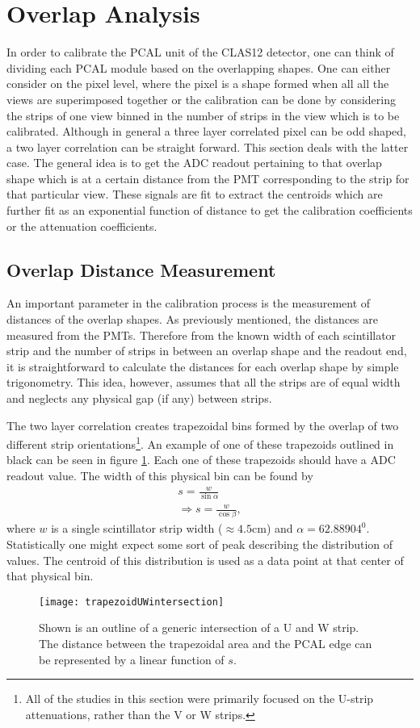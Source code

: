 \section{Overlap Analysis}
In order to calibrate the PCAL unit of the CLAS12 detector, one can think of dividing each PCAL module based on the 
overlapping shapes. One can either consider on the pixel level, where the pixel is a shape formed when all 
all the views are superimposed together or the calibration can be done by considering the strips of one 
view binned in the number of strips in the view which is to be calibrated. Although in general a three layer 
correlated pixel can be odd shaped, a two layer correlation can be straight forward. This section deals with the 
latter case. The general idea is to get the ADC readout pertaining to that overlap shape which is at a certain 
distance from the PMT corresponding to the strip for that particular view. These signals are fit to extract the 
centroids which are further fit as an exponential function of distance to get the calibration coefficients 
or the attenuation coefficients. 


\FloatBarrier
\subsection{Overlap Distance Measurement}
An important parameter in the calibration process is the measurement of distances of the overlap shapes. 
As previously mentioned, the distances are measured from the PMTs. Therefore from the known width of each 
scintillator strip and the number of strips in between an overlap shape and the readout end, it is 
straightforward to calculate the distances for each overlap shape by simple trigonometry. This idea, 
however, assumes that all the strips are of equal width and neglects any physical gap (if any) between strips.

The two layer correlation creates trapezoidal bins formed by the overlap of two different 
strip orientations\footnote{All of the studies in this section were primarily focused on the U-strip 
attenuations, rather than the V or W strips.}. An example of one of these trapezoids outlined in black can be 
seen in figure \ref{fig:trapezoidUWintersection}. Each one of these trapezoids should have a ADC readout value. The width 
of this physical bin can be found by
\begin{eqnarray}
 s = \frac{w}{\sin{\alpha}}    \nonumber\\
\Rightarrow s = \frac{w}{\cos{\beta}},
\end{eqnarray}
where $w$ is a single scintillator strip width ($\approx 4.5$cm) and $\alpha = 62.88904^0$. Statistically one might expect some 
sort of peak describing the distribution of values. The centroid of this distribution is used as a data point 
at that center of that physical bin.
\begin{figure}[t]
\centering
\texttt{[image: trapezoidUWintersection]}
\caption{Shown is an outline of a generic intersection of a U and W strip. The distance between the trapezoidal area and the 
PCAL edge can be represented by a linear function of $s$.}
\label{fig:trapezoidUWintersection}
\end{figure}
\FloatBarrier

\clearpage
